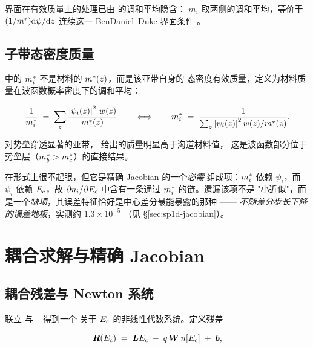 界面在有效质量上的处理已由  的调和平均隐含：
$\bar m_i$ 取两侧的调和平均，等价于 $(1/m^{*})\mathrm{d}\psi/\mathrm{d} z$ 连续这一
BenDaniel--Duke 界面条件 \cite{benDaniel1966}。

\subsection{子带态密度质量}
\label{sec:sp1d-mass}

 中的 $m^{*}_i$ 不是材料的 $m^{*}(z)$，而是该亚带自身的
态密度有效质量，定义为材料质量在波函数概率密度下的调和平均：

\begin{equation}
\frac{1}{m^{*}_i} \;=\; \sum_{z} \frac{\left\lvert \psi_i(z) \right\rvert^{2}\,w(z)}{m^{*}(z)}
\qquad\Longleftrightarrow\qquad
m^{*}_i \;=\; \frac{1}{\sum_z \left\lvert \psi_i(z) \right\rvert^{2}w(z)/m^{*}(z)} .
\label{eq:subband-mass}
\end{equation}

对势垒穿透显著的亚带， 给出的质量明显高于沟道材料值，
这是波函数部分位于势垒层（$m^{*}_{b}>m^{*}_{c}$）的直接结果。

 在形式上很不起眼，但它是精确 Jacobian 的一个\emph{必需}
组成项：$m^{*}_i$ 依赖 $\psi_i$，而 $\psi_i$ 依赖 $E_{\mathrm{c}}$，故
$\partial n_i/\partial E_{\mathrm{c}}$ 中含有一条通过 $m^{*}_i$ 的链。遗漏该项不是
"小近似"，而是一个\emph{缺项}，其误差特征恰好是中心差分最能暴露的那种 ——
\emph{不随差分步长下降的误差地板}，实测约 $1.3\times10^{-5}$
（见 \S\ref{sec:sp1d-jacobian}）。

\section{耦合求解与精确 Jacobian}
\label{sec:sp1d-coupling}

\subsection{耦合残差与 Newton 系统}
\label{sec:sp1d-residual}

联立  与 -- 得到一个
关于 $E_{\mathrm{c}}$ 的非线性代数系统。定义残差

\begin{equation}
\bm{R}(E_{\mathrm{c}}) \;=\; \bm{L}E_{\mathrm{c}} \;-\; q\,\bm{W}\,n[E_{\mathrm{c}}] \;+\; \bm{b},
\label{eq:residual}
\end{equation}

